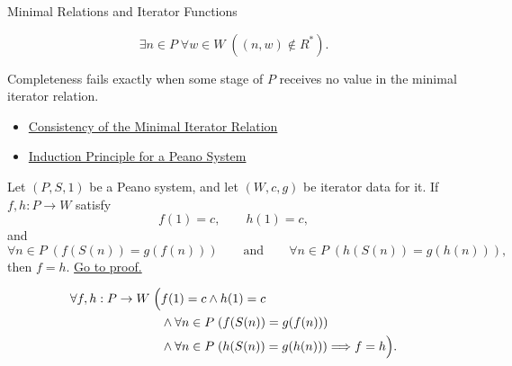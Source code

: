 \begin{topicbox}{Minimal Relations and Iterator Functions}
\begin{remark*}
\[
\exists n\in P\;\forall w\in W\;((n,w)\notin R^*).
\]
\end{remark*}

\begin{remark*}
Completeness fails exactly when some stage of $P$ receives no value in the
minimal iterator relation.
\end{remark*}

\begin{remark*}[Dependencies]
\begin{itemize}
  \item \hyperref[lem:iterator-relation-consistency]{Consistency of the Minimal Iterator Relation}
  \item \hyperref[thm:induction-principle-for-peano-system]{Induction Principle for a Peano System}
\end{itemize}
\end{remark*}

\begin{tcolorbox}[colback=lembox, colframe=lemborder, arc=2pt,
  left=6pt, right=6pt, top=4pt, bottom=4pt,
  title={\small\textbf{Lemma (Uniqueness of Iterator Functions)}},
  fonttitle=\small\bfseries]
\begin{lemma}
\label{lem:uniqueness-of-iterator-functions}
Let $(P,S,1)$ be a Peano system, and let $(W,c,g)$ be iterator data for it. If
$f,h:P\to W$ satisfy
\[
f(1)=c,\qquad h(1)=c,
\]
and
\[
\forall n\in P\;(f(S(n))=g(f(n)))
\qquad\text{and}\qquad
\forall n\in P\;(h(S(n))=g(h(n))),
\]
then $f=h$.
\hyperref[prf:uniqueness-of-iterator-functions]{Go to proof.}
\end{lemma}
\end{tcolorbox}

\begin{remark*}
\[
\begin{aligned}
\forall f,h:P\to W\;\Bigl(&
f(1)=c\land h(1)=c\\
&\land \forall n\in P\;(f(S(n))=g(f(n)))\\
&\land \forall n\in P\;(h(S(n))=g(h(n)))
\Longrightarrow f=h\Bigr).
\end{aligned}
\]
\end{remark*}



\end{topicbox}
